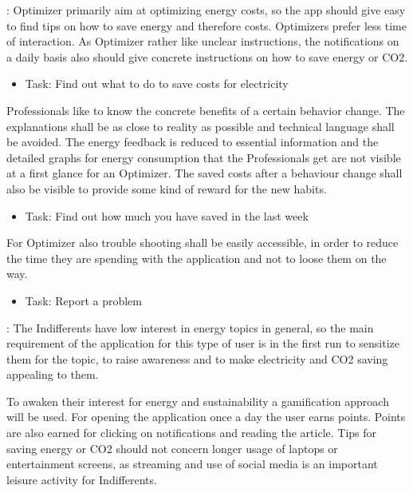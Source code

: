 \begin{enumerate}
	: Optimizer primarily aim at optimizing energy costs, so the app should give easy to find tips on how to save energy and therefore costs. Optimizers prefer less time of interaction. As Optimizer rather like unclear instructions, the notifications on a daily basis also should give concrete instructions on how to save energy or CO2.
	
	\begin{itemize}
		\item Task: Find out what to do to save costs for electricity
	\end{itemize}
	
	 Professionals like to know the concrete benefits of a certain behavior change. The explanations shall be as close to reality as possible and technical language shall be avoided. The energy feedback is reduced to essential information and the detailed graphs for energy consumption that the Professionals get are not visible at a first glance for an Optimizer. The saved costs after a behaviour change shall also be visible to provide some kind of reward for the new habits.
	 
	 \begin{itemize}
	 	\item Task: Find out how much you have saved in the last week
	 \end{itemize}
	
	For Optimizer also trouble shooting shall be easily accessible, in order to reduce the time they are spending with the application and not to loose them on the way.
	
	\begin{itemize}
		\item Task: Report a problem
	\end{itemize}
	
	:
	The Indifferents have low interest in energy topics in general, so the main requirement of the application for this type of user is in the first run to sensitize them for the topic, to raise awareness and to make electricity and CO2 saving appealing to them. 
	
	To awaken their interest for energy and sustainability a gamification approach will be used. For opening the application once a day the user earns points. Points are also earned for clicking on notifications and reading the article. Tips for saving energy or CO2 should not concern longer usage of laptops or entertainment screens, as streaming and use of social media is an important leisure activity for Indifferents.
	

\end{enumerate}

